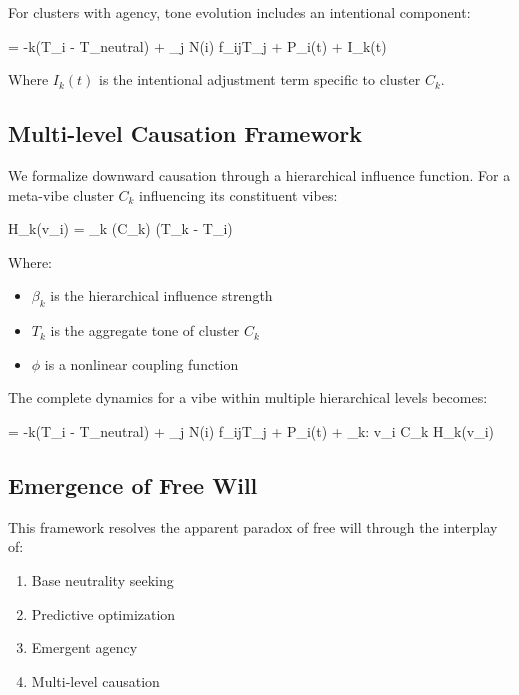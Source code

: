 \documentclass{article}
\let\oldequation\equation
\let\endoldequation\endequation
\renewenvironment{equation}{%
    \noindent\vspace{-\parskip}\vspace{-\baselineskip}%
    \oldequation
}{%
    \endoldequation
    \noindent\vspace{-\parskip}\vspace{-\baselineskip}%
}
\theoremstyle{definition}
\begin{document}
For clusters with agency, tone evolution includes an intentional component:

\begin{equation}
 = -k(T_i - T_{neutral}) + \sum_{j \in N(i)} f_{ij}T_j + P_i(t) + I_k(t)
\end{equation}

Where $I_k(t)$ is the intentional adjustment term specific to cluster $C_k$.

\subsection{Multi-level Causation Framework}

We formalize downward causation through a hierarchical influence function. For a meta-vibe cluster $C_k$ influencing its constituent vibes:

\begin{equation}
H_k(v_i) = \beta_k \cdot {}(C_k) \cdot \phi(T_k - T_i)
\end{equation}

Where:
\begin{itemize}
\item $\beta_k$ is the hierarchical influence strength
\item $T_k$ is the aggregate tone of cluster $C_k$
\item $\phi$ is a nonlinear coupling function
\end{itemize}

The complete dynamics for a vibe within multiple hierarchical levels becomes:

\begin{equation}
 = -k(T_i - T_{neutral}) + \sum_{j \in N(i)} f_{ij}T_j + P_i(t) + \sum_{k: v_i \in C_k} H_k(v_i)
\end{equation}

\subsection{Emergence of Free Will}

This framework resolves the apparent paradox of free will through the interplay of:

\begin{enumerate}
\item Base neutrality seeking
\item Predictive optimization
\item Emergent agency
\item Multi-level causation
\end{enumerate}
\end{document}
